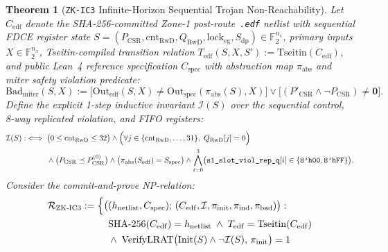 \documentclass[10pt,twocolumn]{article}
\theoremstyle{spectralthm}
\newtheorem{theorem}{Theorem}[section]
\begin{document}
\begin{theorem}[\texttt{ZK-IC3} Infinite-Horizon Sequential Trojan Non-Reachability]
\label{thm:zk_ic3}
Let $C_{\mathrm{edf}}$ denote the SHA-256-committed Zone-1 post-route~\texttt{.edf} netlist with sequential FDCE register state $S = (P_{\mathrm{CSR}}, \mathrm{cnt}_{\mathrm{RwD}}, Q_{\mathrm{RwD}}, \mathrm{lock}_{\mathrm{eg}}, S_{\mathrm{dp}}) \in \mathbb{F}_2^{n_s}$, primary inputs $X \in \mathbb{F}_2^{n_x}$, Tseitin-compiled transition relation $T_{\mathrm{edf}}(S,X,S') := \mathrm{Tseitin}(C_{\mathrm{edf}})$, and public Lean~4 reference specification $C_{\mathrm{spec}}$ with abstraction map $\pi_{\mathrm{abs}}$ and miter safety violation predicate:
\begin{equation}
\label{eq:bad_miter}
\mathrm{Bad}_{\mathrm{miter}}(S,X) := \bigl[\mathrm{Out}_{\mathrm{edf}}(S,X) \neq \mathrm{Out}_{\mathrm{spec}}(\pi_{\mathrm{abs}}(S),X)\bigr]
\vee \bigl[(P'_{\mathrm{CSR}} \wedge \neg P_{\mathrm{CSR}}) \neq \mathbf{0}\bigr].
\end{equation}
Define the explicit 1-step inductive invariant $\mathcal{I}(S)$ over the sequential control, 8-way replicated violation, and FIFO registers:
\begin{equation}
\label{eq:ic3_invariant}
\begin{aligned}
\mathcal{I}(S) :\iff\;& \bigl(0 \le \mathrm{cnt}_{\mathrm{RwD}} \le 32\bigr)
\wedge \Bigl(\forall j \in \{\mathrm{cnt}_{\mathrm{RwD}}, \ldots, 31\},\; Q_{\mathrm{RwD}}[j] = 0\Bigr)\\
&\wedge \bigl(P_{\mathrm{CSR}} \preceq P_{\mathrm{CSR}}^{(0)}\bigr) \wedge \bigl(\pi_{\mathrm{abs}}(S_{\mathrm{edf}}) = S_{\mathrm{spec}}\bigr)
\wedge \bigwedge_{i=0}^3 \bigl(\texttt{s1\_slot\_viol\_rep\_q}[i] \in \{\texttt{8'h00}, \texttt{8'hFF}\}\bigr).
\end{aligned}
\end{equation}
Consider the commit-and-prove NP-relation:
\begin{equation}
\label{eq:zklec_np}
\begin{aligned}
\mathcal{R}_{\mathrm{ZK\text{-}IC3}} := \Bigl\{\bigl(&(h_{\mathrm{netlist}}, C_{\mathrm{spec}});\, (C_{\mathrm{edf}}, \mathcal{I}, \pi_{\mathrm{init}}, \pi_{\mathrm{ind}}, \pi_{\mathrm{bad}})\bigr) :\\
&\mathrm{SHA\text{-}256}(C_{\mathrm{edf}}) = h_{\mathrm{netlist}} \;\wedge\; T_{\mathrm{edf}} = \mathrm{Tseitin}(C_{\mathrm{edf}})\\
&\wedge\; \mathrm{VerifyLRAT}\bigl(\mathrm{Init}(S) \wedge \neg\mathcal{I}(S),\, \pi_{\mathrm{init}}\bigr) = 1\\

\end{aligned}
\end{equation}
\end{theorem}
\end{document}

